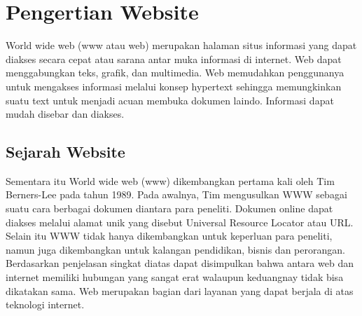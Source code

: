 

\section{Pengertian Website}
World wide web (www atau web) merupakan halaman situs informasi yang dapat diakses secara cepat atau sarana
antar muka informasi di internet. Web dapat menggabungkan teks, grafik, dan multimedia. Web memudahkan
penggunanya untuk mengakses informasi melalui konsep hypertext sehingga memungkinkan  suatu text untuk
menjadi acuan membuka dokumen laindo. Informasi dapat mudah disebar dan diakses.

\subsection{Sejarah Website}
Sementara itu World wide web (www) dikembangkan pertama kali oleh Tim Berners-Lee pada tahun 1989. Pada
awalnya, Tim mengusulkan WWW sebagai suatu cara berbagai dokumen diantara para peneliti. Dokumen online dapat
diakses melalui alamat unik yang disebut Universal Resource Locator atau URL. Selain itu WWW tidak hanya
dikembangkan untuk keperluan para peneliti, namun juga dikembangkan untuk kalangan pendidikan, bisnis dan
perorangan. Berdasarkan penjelasan singkat diatas dapat disimpulkan bahwa antara web dan internet memiliki
hubungan yang sangat erat walaupun keduangnay tidak bisa dikatakan sama. Web merupakan bagian dari layanan
yang dapat berjala di atas teknologi internet.

